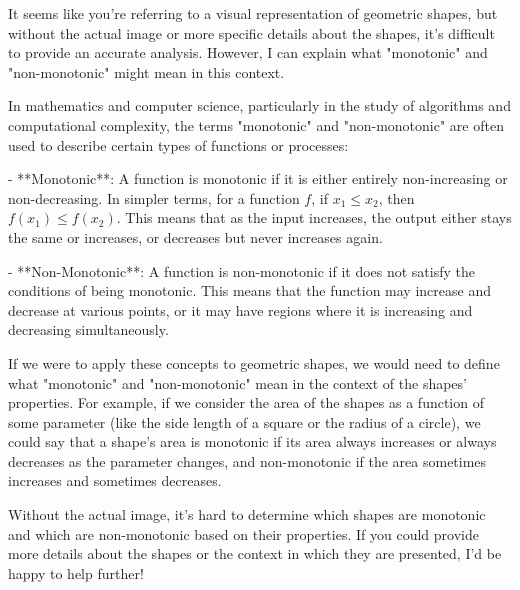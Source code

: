 It seems like you're referring to a visual representation of geometric shapes, but without the actual image or more specific details about the shapes, it's difficult to provide an accurate analysis. However, I can explain what "monotonic" and "non-monotonic" might mean in this context.

In mathematics and computer science, particularly in the study of algorithms and computational complexity, the terms "monotonic" and "non-monotonic" are often used to describe certain types of functions or processes:

- **Monotonic**: A function is monotonic if it is either entirely non-increasing or non-decreasing. In simpler terms, for a function \( f \), if \( x_1 \leq x_2 \), then \( f(x_1) \leq f(x_2) \). This means that as the input increases, the output either stays the same or increases, or decreases but never increases again.
  
- **Non-Monotonic**: A function is non-monotonic if it does not satisfy the conditions of being monotonic. This means that the function may increase and decrease at various points, or it may have regions where it is increasing and decreasing simultaneously.

If we were to apply these concepts to geometric shapes, we would need to define what "monotonic" and "non-monotonic" mean in the context of the shapes' properties. For example, if we consider the area of the shapes as a function of some parameter (like the side length of a square or the radius of a circle), we could say that a shape's area is monotonic if its area always increases or always decreases as the parameter changes, and non-monotonic if the area sometimes increases and sometimes decreases.

Without the actual image, it's hard to determine which shapes are monotonic and which are non-monotonic based on their properties. If you could provide more details about the shapes or the context in which they are presented, I'd be happy to help further!